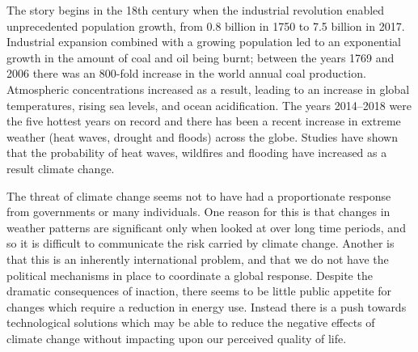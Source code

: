 The story begins in the 18th century when the industrial revolution enabled unprecedented population growth, from 0.8 billion in 1750 to 7.5 billion in 2017.\autocite{Kaneda2017}
Industrial expansion combined with a growing population led to an exponential growth in the amount of coal and oil being burnt; between the years 1769 and 2006 there was an 800-fold increase in the world annual coal production.\autocite{MacKay2009}
Atmospheric  concentrations increased as a result, leading to an increase in global temperatures, rising sea levels, and ocean acidification. The years 2014--2018 were the five hottest years on record \autocite{gistemp2018} and there has been a recent increase in extreme weather (heat waves, drought and floods) across the globe.\autocite{easac2018} Studies have shown that the probability of heat waves,\autocite{Black2016} wildfires\autocite{Abatzoglou2016} and flooding \autocite{Sweet2016,vanderWiel2017} have increased as a result climate change.

The threat of climate change seems not to have had a proportionate response from governments or many individuals. One reason for this is that changes in weather patterns are significant only when looked at over long time periods, and so it is difficult to communicate the risk carried by climate change. Another is that this is an inherently international problem, and that we do not have the political mechanisms in place to coordinate a global response. Despite the dramatic consequences of inaction, there seems to be little public appetite for changes which require a reduction in energy use. Instead there is a push towards technological solutions which may be able to reduce the negative effects of climate change without impacting upon our perceived quality of life.



